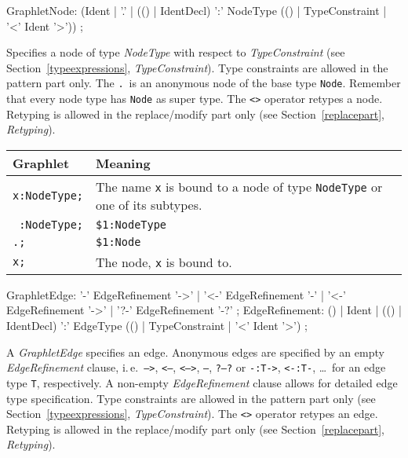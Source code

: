 \begin{rail}
GraphletNode: (Ident | 
    '.' |
    (() | IdentDecl) ':' NodeType (() | TypeConstraint | '<' Ident '>')) ;   
\end{rail}
Specifies a node of type \emph{NodeType} with respect to \emph{TypeConstraint} (see Section~\ref{typeexpressions}, \emph{TypeConstraint}). 
Type constraints are allowed in the pattern part only. 
The \texttt{.}\ is an anonymous node of the base type \texttt{Node}. 
Remember that every node type has \texttt{Node} as super type. The \texttt{<>} operator retypes a node. Retyping is allowed in the replace/modify part only (see Section~\ref{replacepart}, \emph{Retyping}).
\begin{center}
  \begin{tabularx}{\linewidth}{lX}
    \textbf{Graphlet} & \textbf{Meaning}\\ \hline
    \texttt{x:NodeType;} & The name \texttt{x} is bound to a node of type \texttt{NodeType} or one of its subtypes. \\
    \texttt{ :NodeType;} & \texttt{\$1:NodeType} \\
    \texttt{.;} & \texttt{\$1:Node} \\
    \texttt{x;} & The node, \texttt{x} is bound to.
  \end{tabularx}
\end{center} 

\begin{rail}
  GraphletEdge: '-' EdgeRefinement '->'  | '<-' EdgeRefinement '-'  | '<-' EdgeRefinement '->' | '?-' EdgeRefinement '-?' ;
  EdgeRefinement: () | Ident | (() | IdentDecl) ':' EdgeType (() | TypeConstraint | '<' Ident '>') ;
\end{rail}
A \emph{GraphletEdge} specifies an edge. 
Anonymous edges are specified by an empty \emph{EdgeRefinement} clause, i.\,e.\ \texttt{-->}, \texttt{<--}, \texttt{<-->}, \texttt{--}, \texttt{?--?} or \texttt{-:T->}, \texttt{<-:T-}, \dots\ for an edge type \texttt{T}, respectively. 
A non-empty \emph{EdgeRefinement} clause allows for detailed edge type specification. 
Type constraints are allowed in the pattern part only (see Section~\ref{typeexpressions}, \emph{TypeConstraint}). The \texttt{<>} operator retypes an edge. Retyping is allowed in the replace/modify part only (see Section~\ref{replacepart}, \emph{Retyping}).

